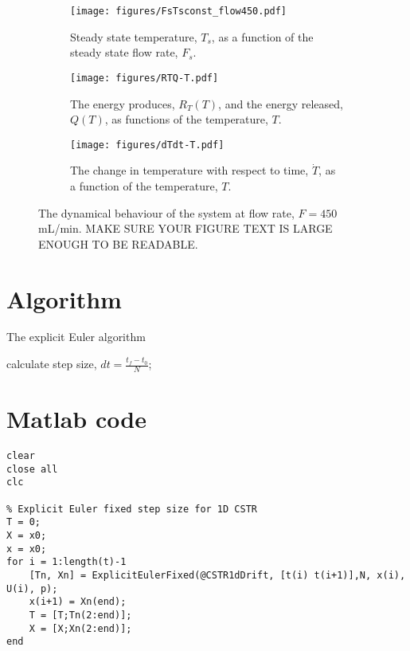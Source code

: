 \begin{figure}[!tb]
\centering
    \begin{subfigure}[b]{0.3\textwidth}
         \centering
         \texttt{[image: figures/FsTsconst\_flow450.pdf]}
         \caption{Steady state temperature, $T_s$, as a function of the steady state flow rate, $F_s$.}
         \label{fig:FsTsconst_flow450}
     \end{subfigure}
     \hfill
     \begin{subfigure}[b]{0.3\textwidth}
         \centering
         \texttt{[image: figures/RTQ-T.pdf]}
         \caption{The energy produces, $R_T(T)$, and the energy released, $Q(T)$, as functions of the temperature, $T$.}
         \label{fig:RTQ-T}
     \end{subfigure}
     \hfill
     \begin{subfigure}[b]{0.3\textwidth}
         \centering
         \texttt{[image: figures/dTdt-T.pdf]}
         \caption{The change in temperature with respect to time, $\dot T$, as a function of the temperature, $T$.}
         \label{fig:dTdt-T}
     \end{subfigure}
        \caption{The dynamical behaviour of the system at flow rate, $F=450$ mL/min. MAKE SURE YOUR FIGURE TEXT IS LARGE ENOUGH TO BE READABLE.}
        \label{fig:flow rate 450}
\end{figure}


\section{Algorithm}

\begin{algorithm}
\caption{The explicit Euler algorithm}\label{alg:explicit Euler}
calculate step size, $dt=\frac{t_f-t_0}{N}$;\\

\end{algorithm}

\section{Matlab code}

\begin{lstlisting}[caption=Matlab code example]
clear
close all
clc

% Explicit Euler fixed step size for 1D CSTR
T = 0;
X = x0;
x = x0;
for i = 1:length(t)-1
    [Tn, Xn] = ExplicitEulerFixed(@CSTR1dDrift, [t(i) t(i+1)],N, x(i), U(i), p);
    x(i+1) = Xn(end);
    T = [T;Tn(2:end)];
    X = [X;Xn(2:end)];
end
\end{lstlisting}
\label{lst:MatlabCodeLabel1}

\fi